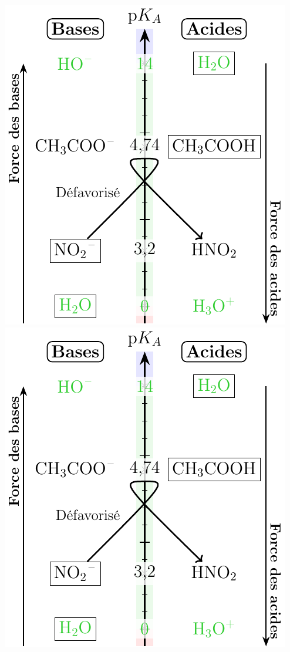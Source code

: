 \documentclass[../../main/main.tex]{subfiles}
\begin{document}
\begin{tcb*}
\begin{minipage}[t]{.35\linewidth}
\begin{center}
{				\includegraphics[width=\linewidth, draft=true]{appl_fin}
			}{
				\includegraphics[width=\linewidth]{appl_fin}
}
\end{center}
\end{minipage}
\end{tcb*}
\end{document}

